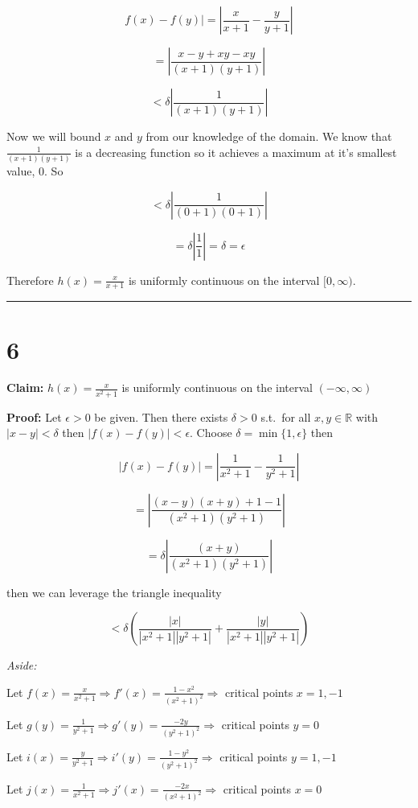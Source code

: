 \documentclass[10pt,letterpaper]{article}
\newcommand\R{\mathds{R}}
\newcommand\ds{\displaystyle}
\newcommand\qedsym{\hfill \rule{2mm}{2mm}}
\begin{document}
\[f(x)-f(y)| = \left|\frac{x}{x+1}-\frac{y}{y+1}\right|\]

\[= \left|\frac{x-y+xy-xy}{(x+1)(y+1)}\right|\]

\[< \delta\left|\frac{1}{(x+1)(y+1)}\right|\]

Now we will bound $x$ and $y$ from our knowledge of the domain. We know that $\frac{1}{(x+1)(y+1)}$ is a decreasing function so it achieves a maximum at it's smallest value, $0$. So

\[<\delta\left|\frac{1}{(0+1)(0+1)}\right|\]

\[=\delta\left|\frac{1}{1}\right| = \delta = \epsilon\]

Therefore $h(x) = \frac{x}{x+1}$ is uniformly continuous on the interval $[0, \infty)$.

\qedsym

\section*{6}

\textbf{Claim:} $h(x) = \frac{x}{x^2+1}$ is uniformly continuous on the interval $(-\infty, \infty)$

\medskip

\textbf{Proof:} Let $\epsilon > 0$ be given. Then there exists $\delta > 0$ s.t.\ for all $x,y\in\R$ with $|x-y|<\delta$ then $|f(x)-f(y)| < \epsilon$. Choose $\delta = \min\{1, \epsilon\}$ then

\[|f(x) - f(y)| = \left|\frac{1}{x^2+1}-\frac{1}{y^2 + 1}\right|\]

\[= \left|\frac{(x-y)(x+y)+1-1}{(x^2+1)(y^2+1)}\right|\]

\[= \delta\left|\frac{(x+y)}{(x^2+1)(y^2+1)}\right|\]

then we can leverage the triangle inequality

\[< \delta\left(\frac{|x|}{|x^2+1||y^2+1|}+\frac{|y|}{|x^2+1||y^2+1|}\right)\]

{\addtolength{\leftskip}{5mm}
\textit{Aside:}

Let $\ds f(x) = \frac{x}{x^2+1} \Rightarrow f'(x) = \frac{1-x^2}{{(x^2+1)}^2}\Rightarrow$ critical points $x=1,-1$

Let $\ds g(y) = \frac{1}{y^2+1} \Rightarrow g'(y) = \frac{-2y}{{(y^2+1)}^2}\Rightarrow$ critical points $y=0$

Let $\ds i(x) = \frac{y}{y^2+1} \Rightarrow i'(y) = \frac{1-y^2}{{(y^2+1)}^2}\Rightarrow$ critical points $y=1,-1$

Let $\ds j(x) = \frac{1}{x^2+1} \Rightarrow j'(x) = \frac{-2x}{{(x^2+1)}^2}\Rightarrow$ critical points $x=0$

}\medskip
\end{document}

